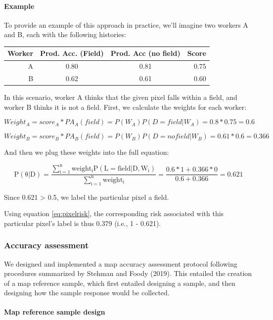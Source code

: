 \documentclass[
  11pt,
  a4paper]{article}
\begin{document}
\hypertarget{example}{%
\paragraph{Example}\label{example}}

To provide an example of this approach in practice, we'll imagine two
workers A and B, each with the following histories:

\begin{longtable}[]{@{}rccr@{}}
\toprule
Worker & Prod. Acc. (Field) & Prod. Acc (no field) & Score \\
\midrule
\endhead
A & 0.80 & 0.81 & 0.75 \\
B & 0.62 & 0.61 & 0.60 \\
\bottomrule
\end{longtable}

In this scenario, worker A thinks that the given pixel falls within a
field, and worker B thinks it is not a field. First, we calculate the
weights for each worker:

\[
Weight_A = score_A * PA_A(field) = P(W_A)P(D=field|W_A) = 0.8 * 0.75 = 0.6
\]

\[
Weight_B = score_B * PA_B(field) = P(W_B)P(D=no field|W_B) = 0.61 * 0.6 = 0.366
\]

And then we plug these weights into the full equation:

\[
\mathrm{P(\theta|D)=\frac{\sum_{i=1}^{n}weight_iP(L = field|D, W_i)}{\sum_{i=1}^{n}weight_i}} = \frac{0.6 * 1 + 0.366 * 0}{0.6 + 0.366} = 0.621
\]

Since 0.621 \textgreater{} 0.5, we label the particular pixel a field.

Using equation \ref{eq:pixelrisk}, the corresponding risk associated
with this particular pixel's label is thus 0.379 (i.e., 1 - 0.621).

\hypertarget{accuracy-assessment}{%
\subsubsection{Accuracy assessment}\label{accuracy-assessment}}

We designed and implemented a map accuracy assessment protocol following
procedures summarized by Stehman and Foody (2019). This entailed the
creation of a map reference sample, which first entailed designing a
sample, and then designing how the sample response would be collected.

\hypertarget{map-reference-sample-design}{%
\paragraph{Map reference sample
design}\label{map-reference-sample-design}}
\end{document}
